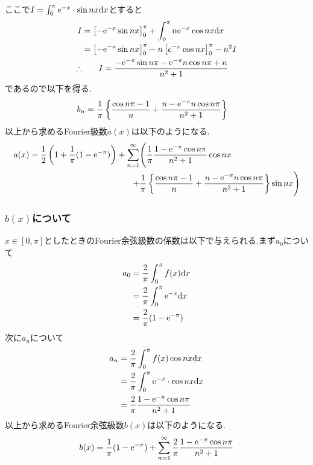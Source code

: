 ここで$I=\int^{\pi}_0{\rm e}^{-x}\cdot\sin nx{\rm d}x$とすると
\begin{align*}
  I          & =\left[-{\rm e}^{-x}\sin nx\right]^\pi_0+\int^\pi_0n{\rm e}^{-x}\cos nx {\rm d}x \\
             & =\left[-{\rm e}^{-x}\sin nx\right]^\pi_0-n\left[e^{-x}\cos nx\right]^\pi_0-n^2I  \\
  \therefore & \qquad I=\frac{-{\rm e}^{-\pi}\sin n\pi-{\rm e}^{-\pi}n\cos n\pi+n}{n^2+1}
\end{align*}
であるので以下を得る.
\begin{align*}
  b_n & =\frac{1}{\pi}\left\{\frac{\cos n\pi-1}{n}+\frac{n-{\rm e}^{-\pi}n\cos n\pi}{n^2+1}\right\}
\end{align*}
以上から求めるFourier級数$a(x)$は以下のようになる.
\begin{align*}
  a(x)=\frac{1}{2}\left(1+\frac{1}{\pi}(1-{\rm e}^{-\pi})\right)
  +\sum_{n=1}^\infty & \Biggl(\frac{1}{\pi}\frac{1-{\rm e}^{-\pi}\cos n\pi}{n^2+1}\cos nx                                        \\
  +                  & \frac{1}{\pi}\left\{\frac{\cos n\pi-1}{n}+\frac{n-{\rm e}^{-\pi}n\cos n\pi}{n^2+1}\right\}\sin nx \Biggr)
\end{align*}

\subsubsection*{$b(x)$について}
$x\in[0,\pi]$としたときのFourier余弦級数の係数は以下で与えられる.まず$a_0$について
\begin{align*}
  a_0 & =\frac{2}{\pi}\int^\pi_{0}f(x){\rm d}x       \\
      & =\frac{2}{\pi}\int^\pi_0{\rm e}^{-x}{\rm d}x \\
      & =\frac{2}{\pi}(1-{\rm e}^{-\pi})
\end{align*}
次に$a_n$について
\begin{align*}
  a_n & =\frac{2}{\pi}\int^\pi_{0}f(x)\cos nx{\rm d}x              \\
      & =\frac{2}{\pi}\int^{\pi}_0{\rm e}^{-x}\cdot\cos nx{\rm d}x \\
      & =\frac{2}{\pi}\frac{1-{\rm e}^{-\pi}\cos n\pi}{n^2+1}
\end{align*}
以上から求めるFourier余弦級数$b(x)$は以下のようになる.
\begin{align*}
  b(x)=\frac{1}{\pi}(1-{\rm e}^{-\pi})+\sum^\infty_{n=1}\frac{2}{\pi}\frac{1-{\rm e}^{-\pi}\cos n\pi}{n^2+1}
\end{align*}

